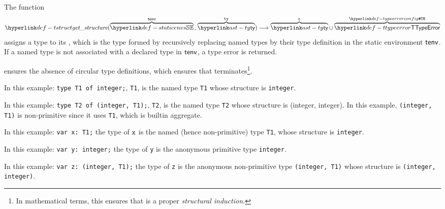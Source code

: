 \hypertarget{def-structure}{}
The function
\[
  \tstruct(\overname{\staticenvs}{\tenv} \aslsep \overname{\ty}{\tty}) \aslto \overname{\ty}{\vt} \cup \overname{\TTypeError}{\TypeErrorConfig}
\]
assigns a type to its \hypertarget{def-tstruct}{\emph{\structure}}, which is the type formed by
recursively replacing named types by their type definition in the static environment $\textsf{tenv}$.
If a named type is not associated with a declared type in $\textsf{tenv}$, a type error is returned.

 ensures the absence of circular type definitions,
which ensures that  terminates\footnote{In mathematical terms,
this ensures that  is a proper \emph{structural induction.}}.

In this example:
\texttt{type T1 of integer;}, \texttt{T1}, is the named type \texttt{T1}
whose structure is \texttt{integer}.

In this example:
\texttt{type T2 of (integer, T1);}, \texttt{T2},
is the named type \texttt{T2} whose structure is (integer, integer). In this
example, \texttt{(integer, T1)} is non-primitive since it uses \texttt{T1}, which is builtin aggregate.

In this example:
\texttt{var x: T1;}
the type of $\texttt{x}$ is the named (hence non-primitive) type \texttt{T1}, whose structure
is \texttt{integer}.

In this example:
\texttt{var y: integer;}
the type of \texttt{y} is the anonymous primitive type \texttt{integer}.

In this example:
\texttt{var z: (integer, T1);}
the type of \texttt{z} is the anonymous non-primitive type
\texttt{(integer, T1)} whose structure is \texttt{(integer, integer)}.

